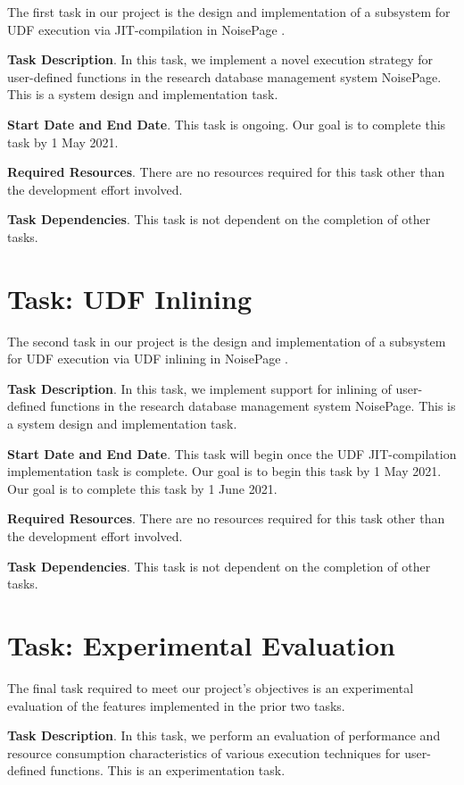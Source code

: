 \documentclass{vldb}
\begin{document}
The first task in our project is the design and implementation of a subsystem for UDF execution via JIT-compilation in NoisePage \cite{noisepage}.

\textbf{Task Description}. In this task, we implement a novel execution strategy for user-defined functions in the research database management system NoisePage. This is a system design and implementation task.

\textbf{Start Date and End Date}. This task is ongoing. Our goal is to complete this task by 1 May 2021.

\textbf{Required Resources}. There are no resources required for this task other than the development effort involved.

\textbf{Task Dependencies}. This task is not dependent on the completion of other tasks.

\section{Task: UDF Inlining}

The second task in our project is the design and implementation of a subsystem for UDF execution via UDF inlining in NoisePage \cite{noisepage}.

\textbf{Task Description}. In this task, we implement support for inlining of user-defined functions in the research database management system NoisePage. This is a system design and implementation task.

\textbf{Start Date and End Date}. This task will begin once the UDF JIT-compilation implementation task is complete. Our goal is to begin this task by 1 May 2021. Our goal is to complete this task by 1 June 2021.

\textbf{Required Resources}. There are no resources required for this task other than the development effort involved.

\textbf{Task Dependencies}. This task is not dependent on the completion of other tasks.

\section{Task: Experimental Evaluation}

The final task required to meet our project's objectives is an experimental evaluation of the features implemented in the prior two tasks.

\textbf{Task Description}. In this task, we perform an evaluation of performance and resource consumption characteristics of various execution techniques for user-defined functions. This is an experimentation task.
\end{document}
